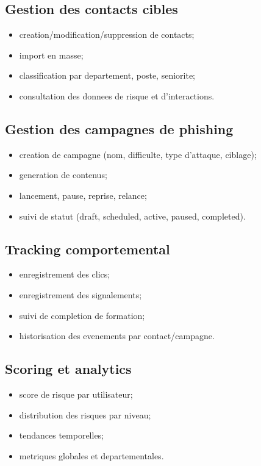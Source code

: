 \documentclass[12pt,a4paper,oneside]{report}
\begin{document}
\subsection{Gestion des contacts cibles}
\begin{itemize}[leftmargin=1.2cm]
  \item creation/modification/suppression de contacts;
  \item import en masse;
  \item classification par departement, poste, seniorite;
  \item consultation des donnees de risque et d'interactions.
\end{itemize}

\subsection{Gestion des campagnes de phishing}
\begin{itemize}[leftmargin=1.2cm]
  \item creation de campagne (nom, difficulte, type d'attaque, ciblage);
  \item generation de contenus;
  \item lancement, pause, reprise, relance;
  \item suivi de statut (draft, scheduled, active, paused, completed).
\end{itemize}

\subsection{Tracking comportemental}
\begin{itemize}[leftmargin=1.2cm]
  \item enregistrement des clics;
  \item enregistrement des signalements;
  \item suivi de completion de formation;
  \item historisation des evenements par contact/campagne.
\end{itemize}

\subsection{Scoring et analytics}
\begin{itemize}[leftmargin=1.2cm]
  \item score de risque par utilisateur;
  \item distribution des risques par niveau;
  \item tendances temporelles;
  \item metriques globales et departementales.
\end{itemize}
\end{document}
